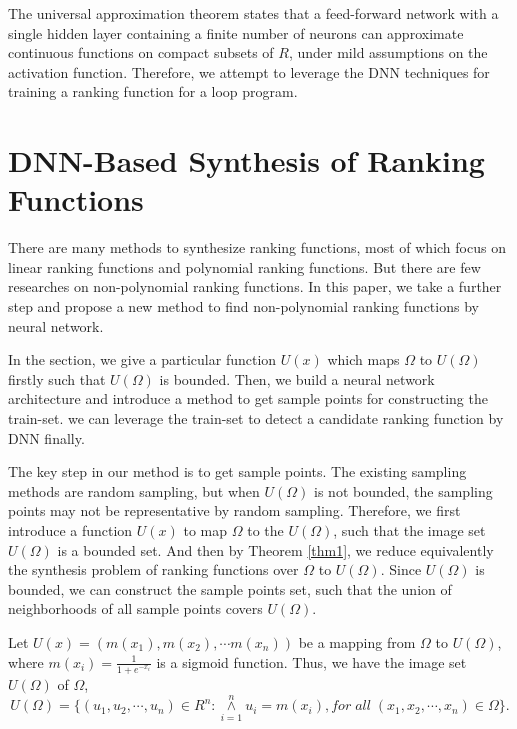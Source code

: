 The universal approximation theorem\cite{hornik1989multilayer}\cite{hornik1990universal}\cite{leshno1993original} states that a feed-forward network with a single hidden layer containing a finite number of neurons can approximate continuous functions on compact subsets of $R$, under mild assumptions on the activation function. Therefore, we attempt to leverage the DNN techniques for training a ranking function for a loop program. 
\section{DNN-Based Synthesis of Ranking Functions}
\label{DNN-Based Synthesis of Ranking Functions}
There are many methods to synthesize ranking functions, most of which focus on linear ranking functions and polynomial ranking functions. But there are few researches on non-polynomial ranking functions\cite{li2019synthesizing}. In this paper, we take a further step and propose a new method to find non-polynomial ranking functions by neural network. 

In the section, we give a particular function $U(x)$ which maps $\Omega $ to $U(\Omega )$ firstly such that $U(\Omega)$ is bounded. Then, we build a neural network architecture and introduce a method to get sample points for constructing the train-set. we can leverage the train-set to detect a candidate ranking function by DNN finally.

The key step in our method is to get sample points. The existing sampling methods are random sampling, but when $U(\Omega)$ is not bounded, the sampling points may not be representative by random sampling. Therefore, we first introduce a function $U(x)$ to map $\Omega $ to the $U(\Omega )$, such that the image set $U(\Omega )$ is a bounded set. And then by Theorem \ref{thm1}, we reduce equivalently the synthesis problem of ranking functions over $\Omega $ to $U(\Omega )$. Since $U(\Omega )$ is bounded, we can construct the sample points set, such that the union of neighborhoods of all sample points covers $U(\Omega )$.

Let $U(x) = (m({x_1}),m({x_2}), \cdots m({x_n}))$ be a mapping from $\Omega $ to $U(\Omega )$, where $m({x_i}) = \frac{1}{{1 + {e^{ - {x_i}}}}}$ is a sigmoid function. Thus, we have the image set $U(\Omega )$ of $\Omega$,
\begin{equation}\label{equ:Ux}
U(\Omega ) = \{ ({u_1},{u_2}, \cdots ,{u_n}) \in {R^n}:\mathop  \wedge \limits_{i = 1}^n {u_i} = m({x_i}), for\;all\;({x_1},{x_2}, \cdots ,{x_n}) \in \Omega \}. 
\end{equation}

